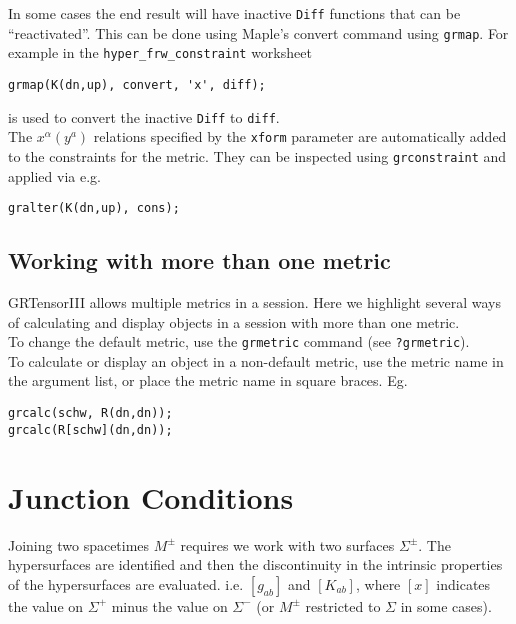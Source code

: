 \documentclass{article}
\begin{document}
In some cases the end result will have inactive \texttt{Diff} functions that can be ``reactivated''. This can be done using Maple's
convert command using \texttt{grmap}. For example in the \texttt{hyper\_frw\_constraint} worksheet
\begin{verbatim}
grmap(K(dn,up), convert, 'x', diff);
\end{verbatim}
is used to convert the inactive \texttt{Diff} to \texttt{diff}. \\

The  $x^\alpha(y^a)$ relations specified by the \texttt{xform} parameter are automatically added to the constraints for the
metric. They can be inspected using \texttt{grconstraint} and applied via e.g.
\begin{verbatim}
gralter(K(dn,up), cons); 
\end{verbatim}

\subsection{Working with more than one metric}
GRTensorIII allows multiple metrics in a session. Here we highlight several ways of calculating and display objects in a session
with more than one metric. \\

To change the default metric, use the \texttt{grmetric} command (see \texttt{?grmetric}).\\

To calculate or display an object in a non-default metric, use the metric name in the argument list, or place the metric name in 
square braces. Eg.
\begin{verbatim}
grcalc(schw, R(dn,dn));
grcalc(R[schw](dn,dn));
\end{verbatim}

\FloatBarrier
\section{Junction Conditions}
Joining two spacetimes $M^{\pm}$ requires we work with two surfaces $\Sigma^{\pm}$. The hypersurfaces are identified and then
the discontinuity in the intrinsic properties of the hypersurfaces are evaluated. i.e. $\left[ g_{ab} \right]$ and
$\left[ K_{ab} \right]$, where $\left[ x \right]$ indicates the value on  $\Sigma^{+}$ minus the value on $\Sigma^{-}$
(or $M^\pm$ restricted to $\Sigma$ in some cases). \\
\end{document}
